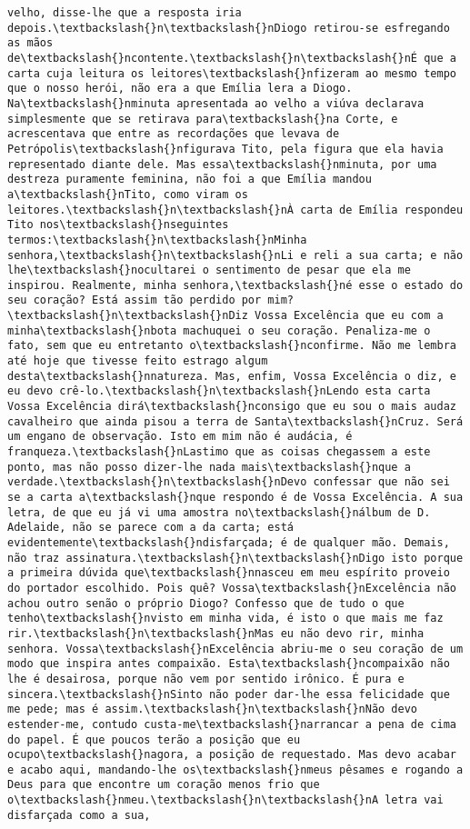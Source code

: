 \begin{Verbatim}[commandchars=\\\{\}]
velho, disse-lhe que a resposta iria depois.\textbackslash{}n\textbackslash{}nDiogo retirou-se esfregando as mãos de\textbackslash{}ncontente.\textbackslash{}n\textbackslash{}nÉ que a carta cuja leitura os leitores\textbackslash{}nfizeram ao mesmo tempo que o nosso herói, não era a que Emília lera a Diogo. Na\textbackslash{}nminuta apresentada ao velho a viúva declarava simplesmente que se retirava para\textbackslash{}na Corte, e acrescentava que entre as recordações que levava de Petrópolis\textbackslash{}nfigurava Tito, pela figura que ela havia representado diante dele. Mas essa\textbackslash{}nminuta, por uma destreza puramente feminina, não foi a que Emília mandou a\textbackslash{}nTito, como viram os leitores.\textbackslash{}n\textbackslash{}nÀ carta de Emília respondeu Tito nos\textbackslash{}nseguintes termos:\textbackslash{}n\textbackslash{}nMinha senhora,\textbackslash{}n\textbackslash{}nLi e reli a sua carta; e não lhe\textbackslash{}nocultarei o sentimento de pesar que ela me inspirou. Realmente, minha senhora,\textbackslash{}né esse o estado do seu coração? Está assim tão perdido por mim?\textbackslash{}n\textbackslash{}nDiz Vossa Excelência que eu com a minha\textbackslash{}nbota machuquei o seu coração. Penaliza-me o fato, sem que eu entretanto o\textbackslash{}nconfirme. Não me lembra até hoje que tivesse feito estrago algum desta\textbackslash{}nnatureza. Mas, enfim, Vossa Excelência o diz, e eu devo crê-lo.\textbackslash{}n\textbackslash{}nLendo esta carta Vossa Excelência dirá\textbackslash{}nconsigo que eu sou o mais audaz cavalheiro que ainda pisou a terra de Santa\textbackslash{}nCruz. Será um engano de observação. Isto em mim não é audácia, é franqueza.\textbackslash{}nLastimo que as coisas chegassem a este ponto, mas não posso dizer-lhe nada mais\textbackslash{}nque a verdade.\textbackslash{}n\textbackslash{}nDevo confessar que não sei se a carta a\textbackslash{}nque respondo é de Vossa Excelência. A sua letra, de que eu já vi uma amostra no\textbackslash{}nálbum de D. Adelaide, não se parece com a da carta; está evidentemente\textbackslash{}ndisfarçada; é de qualquer mão. Demais, não traz assinatura.\textbackslash{}n\textbackslash{}nDigo isto porque a primeira dúvida que\textbackslash{}nnasceu em meu espírito proveio do portador escolhido. Pois quê? Vossa\textbackslash{}nExcelência não achou outro senão o próprio Diogo? Confesso que de tudo o que tenho\textbackslash{}nvisto em minha vida, é isto o que mais me faz rir.\textbackslash{}n\textbackslash{}nMas eu não devo rir, minha senhora. Vossa\textbackslash{}nExcelência abriu-me o seu coração de um modo que inspira antes compaixão. Esta\textbackslash{}ncompaixão não lhe é desairosa, porque não vem por sentido irônico. É pura e sincera.\textbackslash{}nSinto não poder dar-lhe essa felicidade que me pede; mas é assim.\textbackslash{}n\textbackslash{}nNão devo estender-me, contudo custa-me\textbackslash{}narrancar a pena de cima do papel. É que poucos terão a posição que eu ocupo\textbackslash{}nagora, a posição de requestado. Mas devo acabar e acabo aqui, mandando-lhe os\textbackslash{}nmeus pêsames e rogando a Deus para que encontre um coração menos frio que o\textbackslash{}nmeu.\textbackslash{}n\textbackslash{}nA letra vai disfarçada como a sua, 
\end{Verbatim}

